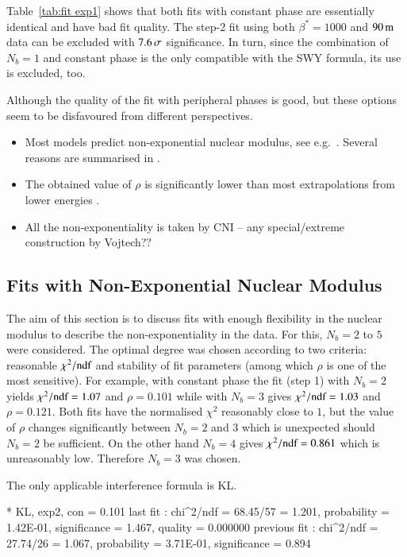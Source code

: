 Table~\ref{tab:fit exp1} shows that both fits with constant phase are essentially identical and have bad fit quality. The step-2 fit using both $\beta^*=1000$ and $90\,{\rm m}$ data can be excluded with $7.6\,{\rm \sigma}$ significance. In turn, since the combination of $N_b=1$ and constant phase is the only compatible with the SWY formula, its use is excluded, too.

Although the quality of the fit with peripheral phases is good, but these options seem to be disfavoured from different perspectives.
\begin{itemize}
\item Most models predict non-exponential nuclear modulus, see e.g.~\cite{elegent}. Several reasons are summarised in .
\item The obtained value of $\rho$ is significantly lower than most extrapolations from lower energies .
\item All the non-exponentiality is taken by CNI -- any special/extreme construction by Vojtech?? 
\end{itemize}


\subsection{Fits with Non-Exponential Nuclear Modulus}
\label{sec:fit exp3}

The aim of this section is to discuss fits with enough flexibility in the nuclear modulus to describe the non-exponentiality in the data. For this, $N_b=2$ to $5$ were considered. The optimal degree was chosen according to two criteria: reasonable $\chi^2/\hbox{ndf}$ and stability of fit parameters (among which $\rho$ is one of the most sensitive). For example, with constant phase the fit (step 1) with $N_b=2$ yields $\chi^2/\hbox{ndf} = 1.07$ and $\rho = 0.101$ while with $N_b=3$ gives $\chi^2/\hbox{ndf} = 1.03$ and $\rho = 0.121$. Both fits have the normalised $\chi^2$ reasonably close to $1$, but the value of $\rho$ changes significantly between $N_b=2$ and $3$ which is unexpected should $N_b=2$ be sufficient. On the other hand $N_b=4$ gives $\chi^2/\hbox{ndf} = 0.861$ which is unreasonably low. Therefore $N_b=3$ was chosen.

The only applicable interference formula is KL.


\iffalse
* KL, exp2, con
\rh       =   0.101 
last fit     : chi^2/ndf = 68.45/57 = 1.201, probability = 1.42E-01, significance = 1.467, quality = 0.000000
previous fit : chi^2/ndf = 27.74/26 = 1.067, probability = 3.71E-01, significance = 0.894

